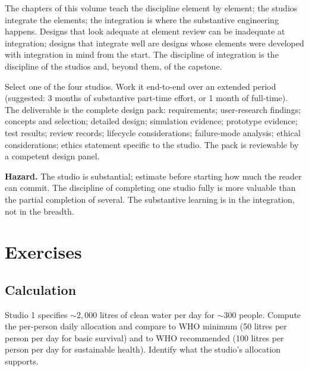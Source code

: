 \begin{principle}
The chapters of this volume teach the discipline element by element; the studios integrate the elements; the integration is where the substantive engineering happens. Designs that look adequate at element review can be inadequate at integration; designs that integrate well are designs whose elements were developed with integration in mind from the start. The discipline of integration is the discipline of the studios and, beyond them, of the capstone.
\end{principle}

\begin{project}
Select one of the four studios. Work it end-to-end over an extended period (suggested: 3 months of substantive part-time effort, or 1 month of full-time). The deliverable is the complete design pack: requirements; user-research findings; concepts and selection; detailed design; simulation evidence; prototype evidence; test results; review records; lifecycle considerations; failure-mode analysis; ethical considerations; ethics statement specific to the studio. The pack is reviewable by a competent design panel.

\textbf{Hazard.} The studio is substantial; estimate before starting how much the reader can commit. The discipline of completing one studio fully is more valuable than the partial completion of several. The substantive learning is in the integration, not in the breadth.
\end{project}

\section{Exercises}

\subsection*{Calculation}

\begin{exercise}
Studio 1 specifies $\sim 2{,}000$ litres of clean water per day for $\sim 300$ people. Compute the per-person daily allocation and compare to WHO minimum (50 litres per person per day for basic survival) and to WHO recommended (100 litres per person per day for sustainable health). Identify what the studio's allocation supports.
\end{exercise}

